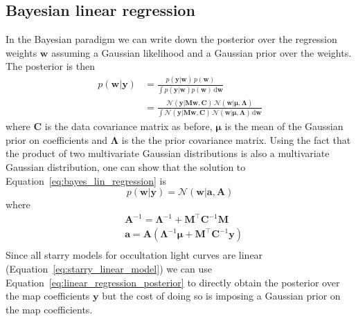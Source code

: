 \documentclass[12pt,dvipsnames]{report}
\newcommand{\ud}{\,\mathrm{d}}
\renewcommand{\vec}[1]{\boldsymbol{\mathbf{#1}}}
\begin{document}
\subsection{Bayesian linear regression}
In the Bayesian paradigm we can write down the posterior over the regression
weights $\vec{w}$ assuming a Gaussian likelihood and a Gaussian prior over the
weights. The posterior is then
\begin{align}
    p(\vec{w}|\vec{y}) & = \frac{p(\vec{y}\lvert \vec{w})\,p(\vec{w})}{\int p(\vec{y}\lvert \vec{w})p(\vec{w}) \ud\vec{w}}                                                                                                                                                 \\
                       & = \frac{    \mathcal{N}(\vec{y} \lvert\vec{M} \vec{w}, \vec{C}) \,\mathcal{N}(\vec{w} \lvert\vec{\mu}, \vec{\Lambda})}{\int \mathcal{N}(\vec{y} \lvert\vec{M} \vec{w}, \vec{C}) \,\mathcal{N}(\vec{w} \lvert\vec{\mu}, \vec{\Lambda}) \ud\vec{w}}
    \label{eq:bayes_lin_regression}
\end{align}
where $\vec{C}$ is the data covariance matrix as before, $\vec{\mu}$ is the mean
of the Gaussian prior on coefficients and $\vec{\Lambda}$ is the the prior covariance matrix.
Using the fact that the product of two multivariate Gaussian distributions is also a
multivariate Gaussian distribution, one can show that
the solution to Equation~\ref{eq:bayes_lin_regression} is
\citep[see for example][]{arXiv:2005.14199}
\begin{equation}
    p(\vec{w}|\vec{y}) =\mathcal{N}(\vec{w} \lvert\vec{a}, \vec{A})
    \label{eq:linear_regression_posterior}
\end{equation}
where
\begin{align}
     & \vec{A}^{-1}   =\vec{\Lambda}^{-1}+\vec{M}^{\intercal} \vec{C}^{-1} \vec{M}                                                     \\
     & \vec{a}     =\vec{A} \left(\boldsymbol{\Lambda}^{-1} \boldsymbol{\mu}+\vec{M}^{\intercal} \mathbf{C}^{-1} \boldsymbol{y}\right) \\
\end{align}
Since all \textsf{starry} models for occultation light curves are linear
(Equation~\ref{eq:starry_linear_model}) we can use Equation~\ref{eq:linear_regression_posterior}
to directly obtain the posterior over the map coefficients $\mathbf{y}$ but the cost
of doing so is imposing a Gaussian prior on the map coefficients.
\end{document}
